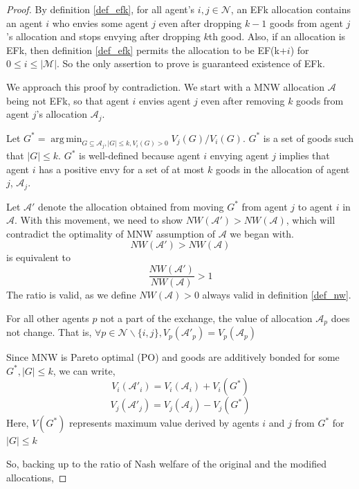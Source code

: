\begin{proof}
By definition \ref{def_efk}, for all agent's $i, j \in \mathcal{N}$, an EFk allocation contains an agent $i$ who envies some agent $j$ even after dropping $k-1$ goods from agent $j$'s allocation and stops envying after dropping $k$th good. Also, if an allocation is EFk, then definition \ref{def_efk} permits the allocation to be EF(k+$i$) for $0 \leq i \leq |\mathcal{M}|$. So the only assertion to prove is guaranteed existence of EFk.

We approach this proof by contradiction. We start with a MNW allocation $\mathcal{A}$ being not EFk, so that agent $i$ envies agent $j$ even after removing $k$ goods from agent $j$'s allocation $\mathcal{A}_j$.

Let $G^* = \operatorname{arg\,min}_{G \subseteq \mathcal{A}_j, |G| \leq k, V_i(G)>0} V_j(G)/V_i(G)$. $G^*$ is a set of goods such that $|G| \leq k$. $G^*$ is well-defined because agent $i$ envying agent $j$ implies that agent $i$ has a positive envy for a set of at most $k$ goods in the allocation of agent $j$, $\mathcal{A}_j$. 

Let $\mathcal{A}'$ denote the allocation obtained from moving $G^*$ from agent $j$ to agent $i$ in $\mathcal{A}$. With this movement, we need to show $NW(\mathcal{A}') > NW(\mathcal{A})$, which will contradict the optimality of MNW assumption of $\mathcal{A}$ we began with.
$$
    NW(\mathcal{A}') > NW(\mathcal{A})
$$
is equivalent to
$$
    \frac{NW(\mathcal{A}')}{NW(\mathcal{A})} > 1
$$
The ratio is valid, as we define $NW(\mathcal{A}) > 0$ always valid in definition \ref{def_nw}.

For all other agents $p$ not a part of the exchange, the value of allocation $\mathcal{A}_p$ does not change. That is, $\forall p \in \mathcal{N}\backslash\{i,j\}, V_p(\mathcal{A}'_p) = V_p(\mathcal{A}_p)$

Since MNW is Pareto optimal (PO) and goods are additively bonded for some $G^*, |G| \leq k$, we can write,
$$
    V_i(\mathcal{A}'_i) = V_i(\mathcal{A}_i) + V_i(G^*)
$$
$$
    V_j(\mathcal{A}'_j) = V_j(\mathcal{A}_j) - V_j(G^*)
$$
Here, $V(G^*)$ represents maximum value derived by agents $i$ and $j$ from $G^*$ for $|G| \leq k$

So, backing up to the ratio of Nash welfare of the original and the modified allocations,


\end{proof}
